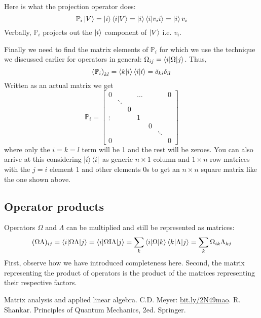 \documentclass[english,seminar,headertitle]{lecture}
\begin{document}
Here is what the projection operator does:
\[
	\mathbb{P}_i\ket{V} = \ket{i}\braket{i|V} = \ket{i}\braket{i | v_i i} = \ket{i} v_i
\]
Verbally, $\mathbb{P}_i$ projects out the $\ket{i}$ component of $\ket{V}$ i.e. $v_i$.

Finally we need to find the matrix elements of $\mathbb{P}_i$ for which we use the technique we discussed earlier for operators in general: $\Omega_{ij} = \braket{i | \Omega | j}$. Thus,
\[
	\left(\mathbb{P}_i\right)_{kl} = \braket{k|i}\braket{i|l} = \delta_{ki}\delta_{il}
\]
Written as an actual matrix we get
\[
	\mathbb{P}_i =
	\begin{bmatrix}
		0 & & & \ldots & & & 0 \\
		& \ddots & & & & & \\
		& & 0 & & & & \\
		\vdots & & & 1 & & & \\
		& & & & 0 & & \\
		& & & & & \ddots & \\
		0 & & & & & & 0 
	\end{bmatrix}
\]
where only the $i = k = l$ term will be 1 and the rest will be zeroes. You can also arrive at this considering $\ket{i}\bra{i}$ as generic $n\times 1$ column and $1\times n$ row matrices with the $j=i$ element 1 and other elements 0s to get an $n\times n$ square matrix like the one shown above.

\subsection{Operator products}

Operators $\Omega$ and $\Lambda$ can be multiplied and still be represented as matrices:
\[
	(\Omega\Lambda)_{ij} = \braket{i | \Omega\Lambda | j} = \braket{i | \Omega \textrm{I} \Lambda | j} = \sum_k \braket{i | \Omega | k}\braket{k | \Lambda | j} = \sum_k \Omega_{ik}\Lambda_{kj}
\]
First, observe how we have introduced completeness here. Second, the matrix representing the product of operators is the product of the matrices representing their respective factors.

\begin{thebibliography}{1}
	Matrix analysis and applied linear algebra. C.D. Meyer: \url{bit.ly/2N49mao}.
	R. Shankar. Principles of Quantum Mechanics, 2ed. Springer.
\end{thebibliography}
\end{document}

